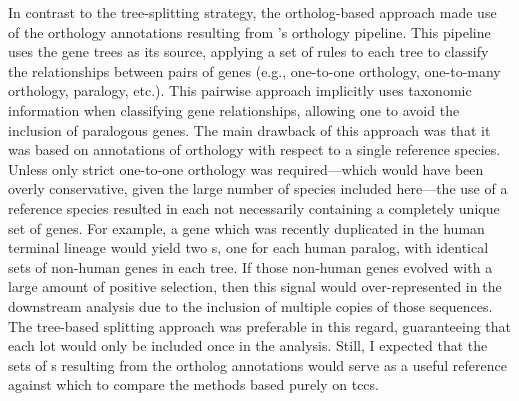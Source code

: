 In contrast to the tree-splitting strategy, the ortholog-based
approach made use of the orthology annotations resulting from \ens{}'s
orthology pipeline.  This pipeline uses the \cmp gene trees as its
source, applying a set of rules to each tree to classify the
relationships between pairs of genes (e.g., one-to-one orthology,
one-to-many orthology, paralogy, etc.). This pairwise approach
implicitly uses taxonomic information when classifying gene
relationships, allowing one to avoid the inclusion of paralogous
genes. The main drawback of this approach was that it was based on
annotations of orthology with respect to a single reference
species. Unless only strict one-to-one orthology was required---which
would have been overly conservative, given the large number of species
included here---the use of a reference species resulted in each
\subtr{} not necessarily containing a completely unique set of
genes. For example, a gene which was recently duplicated in the human
terminal lineage would yield two \subtr{}s, one for each human
paralog, with identical sets of non-human genes in each tree. If those
non-human genes evolved with a large amount of positive selection,
then this signal would over-represented in the downstream analysis due
to the inclusion of multiple copies of those sequences. The tree-based
\subtr splitting approach was preferable in this regard, guaranteeing
that each \ac{lot} would only be included once in the analysis. Still,
I expected that the sets of \subtr{}s resulting from the \ens ortholog
annotations would serve as a useful reference against which to compare
the methods based purely on \acp{tcc}.

